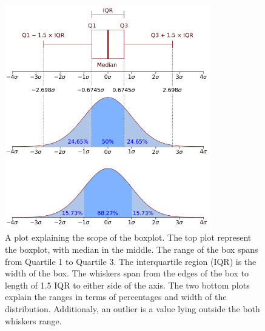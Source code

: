 \begin{figure}[H]
\centering
\includegraphics[width=0.8\textwidth]{figures/chapter4/surrogates/Boxplot_vs_PDF.png}
\caption{A plot explaining the scope of the boxplot. The top plot represent the boxplot, with median in the middle. The range of the box spans from Quartile 1 to Quartile 3. The interquartile region (IQR) is the width of the box. The whiskers span from the edges of the box to length of 1.5 IQR to either side of the axis.
  The two bottom plots explain the ranges in terms of percentages and width of the distribution. Additionaly, an outlier is a value lying outside the both whiskers range. }
\label{fig:boxplot}
\end{figure}

